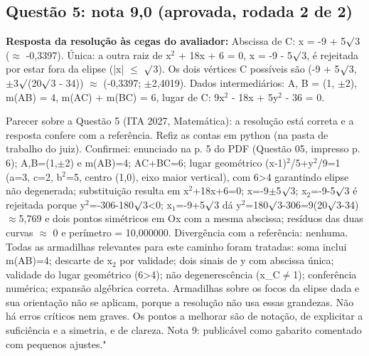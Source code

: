 \documentclass{article}%
\begin{document}
\subsection*{Questão 5: nota 9,0 (aprovada, rodada 2 de 2)}%
\textbf{Resposta da resolução às cegas do avaliador:} Abscissa de C: x = -9 + 5$\surd$3 ($\approx$ -0,3397). Única: a outra raiz de x$^2$ + 18x + 6 = 0, x = -9 - 5$\surd$3, é rejeitada por estar fora da elipse (|x| $\leq$ $\surd$3). Os dois vértices C possíveis são (-9 + 5$\surd$3, $\pm$3$\surd$(20$\surd$3 - 34)) $\approx$ (-0,3397; $\pm$2,4019). Dados intermediários: A, B = (1, $\pm$2), m(AB) = 4, m(AC) + m(BC) = 6, lugar de C: 9x$^2$ - 18x + 5y$^2$ - 36 = 0.\par %
Parecer sobre a Questão 5 (ITA 2027, Matemática): a resolução está correta e a resposta confere com a referência. Refiz as contas em python (na pasta de trabalho do juiz). Confirmei: enunciado na p. 5 do PDF (Questão 05, impresso p. 6); A,B=(1,$\pm$2) e m(AB)=4; AC+BC=6; lugar geométrico (x-1)$^2$/5+y$^2$/9=1 (a=3, c=2, b$^2$=5, centro (1,0), eixo maior vertical), com 6>4 garantindo elipse não degenerada; substituição resulta em x$^2$+18x+6=0; x=-9$\pm$5$\surd$3; x$_{2}$=-9-5$\surd$3 é rejeitada porque y$^2$=-306-180$\surd$3<0; x$_{1}$=-9+5$\surd$3 dá y$^2$=180$\surd$3-306=9(20$\surd$3-34)$\approx$5,769 e dois pontos simétricos em Ox com a mesma abscissa; resíduos das duas curvas $\approx$ 0 e perímetro = 10,000000. Divergência com a referência: nenhuma. Todas as armadilhas relevantes para este caminho foram tratadas: soma inclui m(AB)=4; descarte de x$_{2}$ por validade; dois sinais de y com abscissa única; validade do lugar geométrico (6>4); não degenerescência (x\_C$\neq$1); conferência numérica; expansão algébrica correta. Armadilhas sobre os focos da elipse dada e sua orientação não se aplicam, porque a resolução não usa essas grandezas. Não há erros críticos nem graves. Os pontos a melhorar são de notação, de explicitar a suficiência e a simetria, e de clareza. Nota 9: publicável como gabarito comentado com pequenos ajustes."%
\end{document}
